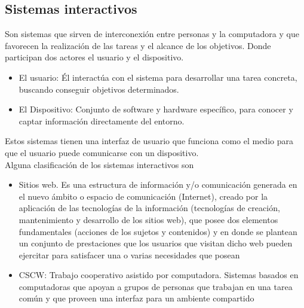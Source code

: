 \subsection{Sistemas interactivos}
Son sistemas que sirven de interconexión entre personas y la computadora y que favorecen la realización de las tareas y el alcance de los objetivos. Donde participan dos actores el usuario y el dispositivo.
\begin{itemize}
\item El usuario: Él interactúa con el sistema para desarrollar una tarea concreta, buscando conseguir objetivos determinados.
\item El Dispositivo: Conjunto de software y hardware específico, para conocer y captar información directamente del entorno.
\end{itemize}
Estos sistemas tienen una interfaz de usuario que funciona como el medio para que el usuario puede comunicarse con un dispositivo\cite{sistemas}.\\
Alguna clasificación de los sistemas interactivos son \cite{raskin2000humane}
\begin{itemize}
\item Sitios web. Es una estructura de información y/o comunicación generada en el nuevo ámbito o espacio de comunicación (Internet), creado por la aplicación de las tecnologías de la información (tecnologías de creación, mantenimiento y desarrollo de los sitios web), que posee dos elementos fundamentales (acciones de los sujetos y contenidos) y en donde se plantean un conjunto de prestaciones que los usuarios que visitan dicho web pueden ejercitar para satisfacer una o varias necesidades que posean \cite{alonso2008sitio}
\item CSCW: Trabajo cooperativo asistido por computadora. Sistemas basados en computadoras que apoyan a grupos de personas que trabajan en una tarea común y que proveen una interfaz para un ambiente compartido\cite{geronimo2002sistemas}
\end{itemize}

